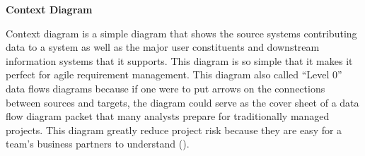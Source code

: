 \flushleft
\textbf{Context Diagram}\\
\justifying

\parx
Context diagram is a simple diagram that shows the source systems contributing data to
a system as well as the major user constituents and downstream information systems
that it supports. This diagram is so simple that it makes it perfect for agile
requirement management. This diagram also called “Level 0” data flows diagrams because
if one were to put arrows on the connections between sources and targets, the diagram
could serve as the cover sheet of a data flow diagram packet that many analysts prepare
for traditionally managed projects. This diagram greatly reduce project risk because
they are easy for a team’s business partners to understand (\cite{hughes_2016}).

